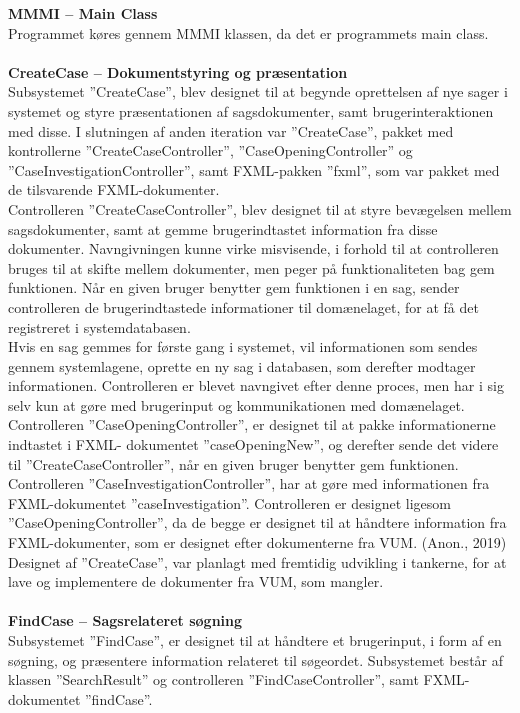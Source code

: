 \textbf{MMMI – Main Class}\\
Programmet køres gennem MMMI klassen, da det er programmets main class.\\\\
\textbf{CreateCase – Dokumentstyring og præsentation}\\
Subsystemet ”CreateCase”, blev designet til at begynde oprettelsen af nye sager i systemet og styre præsentationen af sagsdokumenter, samt brugerinteraktionen med disse. I slutningen af anden iteration var ”CreateCase”, pakket med kontrollerne ”CreateCaseController”, ”CaseOpeningController” og ”CaseInvestigationController”, samt FXML-pakken ”fxml”, som var pakket med de tilsvarende FXML-dokumenter.\\ 
Controlleren ”CreateCaseController”, blev designet til at styre bevægelsen mellem sagsdokumenter, samt at gemme brugerindtastet information fra disse dokumenter. Navngivningen kunne virke misvisende, i forhold til at controlleren bruges til at skifte mellem dokumenter, men peger på funktionaliteten bag gem funktionen. Når en given bruger benytter gem funktionen i en sag, sender controlleren de brugerindtastede informationer til domænelaget, for at få det registreret i systemdatabasen. \\
Hvis en sag gemmes for første gang i systemet, vil informationen som sendes gennem systemlagene, oprette en ny sag i databasen, som derefter modtager informationen. Controlleren er blevet navngivet efter denne proces, men har i sig selv kun at gøre med brugerinput og kommunikationen med domænelaget.\\
Controlleren ”CaseOpeningController”, er designet til at pakke informationerne indtastet i FXML- dokumentet ”caseOpeningNew”, og derefter sende det videre til ”CreateCaseController”, når en given bruger benytter gem funktionen.\\
Controlleren ”CaseInvestigationController”, har at gøre med informationen fra FXML-dokumentet ”caseInvestigation”. Controlleren er designet ligesom ”CaseOpeningController”, da de begge er designet til at håndtere information fra FXML-dokumenter, som er designet efter dokumenterne fra VUM. (Anon., 2019) \\
Designet af ”CreateCase”, var planlagt med fremtidig udvikling i tankerne, for at lave og implementere de dokumenter fra VUM, som mangler.\\ \\
\textbf{FindCase – Sagsrelateret søgning} \\
Subsystemet ”FindCase”, er designet til at håndtere et brugerinput, i form af en søgning, og præsentere information relateret til søgeordet. Subsystemet består af klassen ”SearchResult” og controlleren ”FindCaseController”, samt FXML-dokumentet ”findCase”.\\
